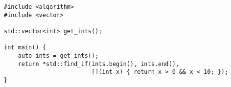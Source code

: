\begin{lstlisting}[title=\href{https://godbolt.org/z/J7cccJ}{\texttt{godbolt.org/z/J7cccJ}}]
#include <algorithm>
#include <vector>

std::vector<int> get_ints();

int main() {
    auto ints = get_ints();
    return *std::find_if(ints.begin(), ints.end(),
                         [](int x) { return x > 0 && x < 10; });
}
\end{lstlisting}
